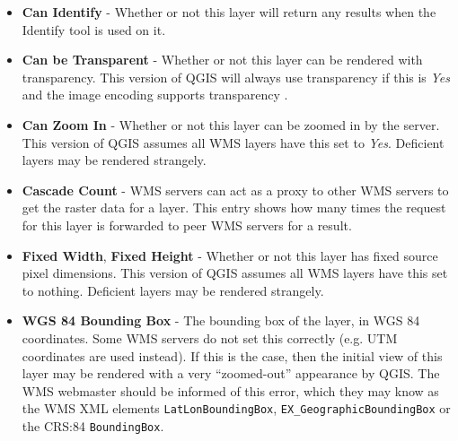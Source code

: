 \begin{itemize}[label=--]
\begin{itemize}[label=--]
\item \textbf{Can Identify}     - Whether or not this layer will return any results
                                  when the Identify tool is used on it.

\item \textbf{Can be Transparent} - Whether or not this layer can be rendered with transparency.
                                    This version of
                                    QGIS will always use transparency if this is \textsl{Yes}
                                    and the image encoding supports transparency
                                    .

\item \textbf{Can Zoom In}      - Whether or not this layer can be zoomed in by the server.  This version
                                  of QGIS assumes all WMS layers have this set to \textsl{Yes}.
                                  Deficient layers may be rendered strangely.

\item \textbf{Cascade Count}    - WMS servers can act as a proxy to other WMS servers to get
                                  the raster data for a layer.  This entry shows how
                                  many times the request for this layer is forwarded to peer
                                  WMS servers for a result.

\item \textbf{Fixed Width}, \textbf{Fixed Height}
                                - Whether or not this layer has fixed source pixel dimensions.
                                  This version
                                  of QGIS assumes all WMS layers have this set to nothing.
                                  Deficient layers may be rendered strangely.

\item \textbf{WGS 84 Bounding Box} - The bounding box of the layer, in WGS 84 coordinates.
                                     Some WMS servers do not set this correctly (e.g. UTM
                                     coordinates are used instead).  If this is the case,
                                     then the initial view of this layer may be rendered
                                     with a very ``zoomed-out'' appearance by QGIS.
                                     The WMS webmaster should be informed of this error,
                                     which they may know as the WMS XML elements
                                     \texttt{LatLonBoundingBox},
                                     \texttt{EX\_GeographicBoundingBox} or
                                     the CRS:84 \texttt{BoundingBox}.


\end{itemize}
\end{itemize}
